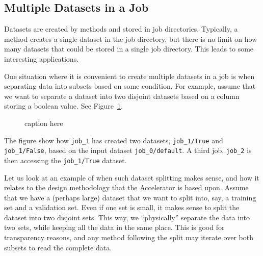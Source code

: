 \documentclass[a4paper]{article}
\begin{document}
\clearpage




\subsection{Multiple Datasets in a Job}

Datasets are created by methods and stored in job directories.
Typically, a method creates a single dataset in the job directory, but
there is no limit on how many datasets that could be stored in a
single job directory.  This leads to some interesting applications.

One situation where it is convenient to create multiple datasets in a
job is when separating data into subsets based on some condition.  For
example, assume that we want to separate a dataset into two disjoint
datasets based on a column storing a boolean value.  See
Figure~\ref{fig:dep_dataset_csvimport_chain}.

\begin{figure}[h!]
  \hspace{1cm}
  
    \caption{caption here}
    \label{fig:dep_dataset_csvimport_chain}
\end{figure}

\noindent The figure show how \texttt{job\_1} has created two
datasets, \texttt{job\_1/True} and \texttt{job\_1/False}, based on the
input dataset \texttt{job\_0/default}.  A third job, \texttt{job\_2}
is then accessing the \texttt{job\_1/True} dataset.



\noindent Let us look at an example of when such dataset splitting
makes sense, and how it relates to the design methodology that the
Accelerator is based upon.  Assume that we have a (perhaps large)
dataset that we want to split into, say, a training set and a
validation set.  Even if one set is small, it makes sense to split the
dataset into two disjoint sets.  This way, we ``physically'' separate
the data into two sets, while keeping all the data in the same place.
This is good for transparency reasons, and any method following the
split may iterate over both subsets to read the complete data.
\end{document}

